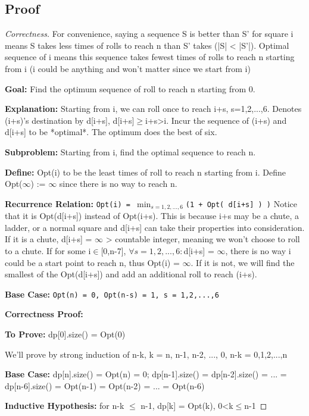 \documentclass[openany]{article}
\begin{document}
\subsection*{Proof}
\begin{proof}[Correctness]{}
    For convenience, saying a sequence S is better than S' for square i means S takes less times of rolls to reach n than S' takes (|S| < |S'|). Optimal sequence of i means this sequence takes fewest times of rolls to reach n starting from i (i could be anything and won't matter since we start from i)
    
\textbf{Goal:} Find the optimum sequence of roll to reach n starting from 0.

\textbf{Explanation:} Starting from i, we can roll once to reach i+s, s=1,2,...,6. Denotes (i+s)'s destination by d[i+s], d[i+s]$\geq$i+s>i. Incur the sequence of (i+s) and d[i+s] to be *optimal*. The optimum does the best of six.
    
\textbf{Subproblem:}
    Starting from i, find the optimal sequence to reach n.
    
\textbf{Define:} Opt(i) to be the least times of roll to reach n starting from i. Define Opt($\infty$) := $\infty$ since there is no way to reach n.
    
\textbf{Recurrence Relation:}
    \texttt{Opt(i) = $\min_{s=1,2,...,6}$(1 + Opt( d[i+s] ) )}
    Notice that it is Opt(d[i+s]) instead of Opt(i+s). This is because i+s may be a chute, a ladder, or a normal square and d[i+s] can take their properties into consideration. If it is a chute, d[i+s] = $\infty$ > countable integer, meaning we won't choose to roll to a chute. If for some i$\in$[0,n-7], $\forall s = 1,2,...,6: $d[i+s] = $\infty$, there is no way i could be a start point to reach n, thus Opt(i) = $\infty$. If it is not, we will find the smallest of the Opt(d[i+s]) and add an additional roll to reach (i+s).
    
\textbf{Base Case:}
    \texttt{Opt(n) = 0, Opt(n-s) = 1, s = 1,2,...,6}
    
\textbf{Correctness Proof:}

    \textbf{To Prove:} dp[0].size() = Opt(0)
    
    We'll prove by strong induction of n-k, k = n, n-1, n-2, ..., 0, n-k = 0,1,2,...,n
    
    \textbf{Base Case:} dp[n].size() = Opt(n) = 0; dp[n-1].size() = dp[n-2].size() = ... = dp[n-6].size() = Opt(n-1) = Opt(n-2) = ... = Opt(n-6)
    
    \textbf{Inductive Hypothesis:} for n-k $\leq$ n-1, dp[k] = Opt(k), 0<k$\leq$n-1
    

\end{proof}
\end{document}
